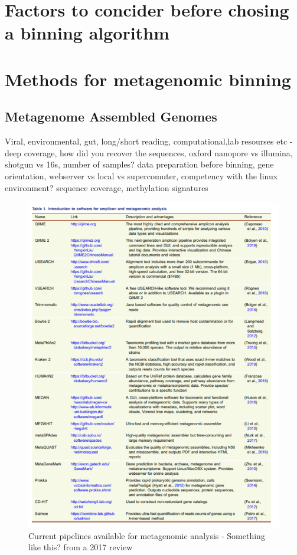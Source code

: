 \documentclass{article}
\begin{document}
\section{Factors to concider before chosing a binning algorithm}
	
\section{Methods for metagenomic binning}
\subsection{Metagenome Assembled Genomes}
Viral, environmental, gut, long/short reading, computational,lab resourses etc - deep coverage, how did you recover the sequences, oxford nanopore vs illumina, shotgun vs 16s, number of samples? data preparation before binning, gene orientation, webserver vs local vs supercomuter, competency with the linux environment? sequence coverage, methylation signatures
\begin{figure}
\centering
\includegraphics[scale=0.7]{figures/table.png}
\caption[Current pipelines available for metagenomic analysis]{
	Current pipelines available for metagenomic analysis - Something like this? from a 2017 review}
\label{Fpipelines}
\end{figure}
\end{document}
